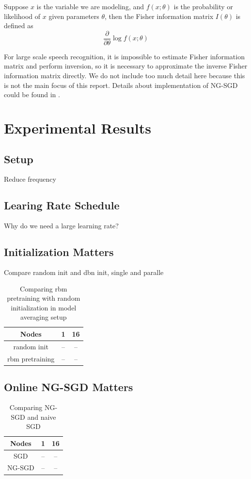 \documentclass{article}
\begin{document}
Suppose $x$ is the variable we are modeling, and $f(x;\theta)$ is the probability or likelihood of $x$ given parameters $\theta$, then the
Fisher information matrix $I(\theta)$ is defined as
\begin{equation}
\frac{\partial}{\partial\theta}\log f(x;\theta)
\end{equation}

For large scale speech recognition, it is impossible to estimate Fisher information matrix and perform inversion, 
so it is necessary to approximate the inverse Fisher information matrix directly. We do not include too much 
detail here because this is not the main focus of this report. Details about implementation of NG-SGD could 
be found in \cite{povey2014parallel}.

\section{Experimental Results}
\subsection{Setup}

Reduce frequency

\subsection{Learing Rate Schedule}
Why do we need a large learning rate?



\subsection{Initialization Matters}
Compare random init and dbn init, single and paralle
\begin{table}
  \centering
  \begin{tabular}{c|c|c}
    \hline
     Nodes          &  1    & 16 \\
    \hline
    random init     & --    & --  \\
    \hline
    rbm pretraining & --    & --\\
    \hline
  \end{tabular}
  \caption{Comparing rbm pretraining with random initialization in model averaging setup }
  \label{tab:init}
\end{table}

\subsection{Online NG-SGD Matters}
\begin{table}
  \centering
  \begin{tabular}{c|c|c}
    \hline
     Nodes  &  1    & 16 \\
    \hline
    SGD     & --    & --  \\
    \hline
    NG-SGD  & --    & --\\
    \hline
  \end{tabular}
  \caption{Comparing NG-SGD and naive SGD}
  \label{tab:ngsgd}
\end{table}
\end{document}
